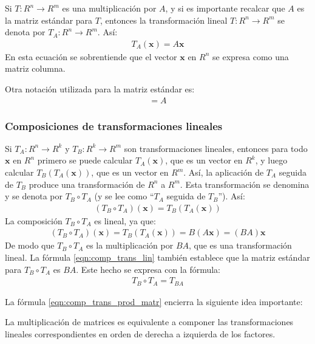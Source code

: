 \documentclass[a4paper,12pt]{article}
\begin{document}
Si $T:R^n\rightarrow R^m$ es una multiplicación por $A$, y si es importante
recalcar que $A$ es la matriz estándar para $T$, entonces la transformación
lineal $T:R^n\rightarrow R^m$ se denota por $T_A:R^n\rightarrow R^m$. Así:
\begin{align*}
  T_A(\mathbf{x})=A\mathbf{x}
\end{align*}
En esta ecuación se sobrentiende que el vector $\mathbf{x}$ en $R^n$ se
expresa como una matriz columna.

Otra notación utilizada para la matriz estándar es:
\begin{align*}
  [T_A]=A
\end{align*}

\subsubsection{Composiciones de transformaciones lineales}

Si $T_A:R^n\rightarrow R^k$ y $T_B:R^k\rightarrow R^m$ son transformaciones
lineales, entonces para todo $\mathbf{x}$ en $R^n$ primero se puede calcular
$T_A(\mathbf{x})$, que es un vector en $R^k$, y luego calcular $T_B\left(
T_A(\mathbf{x}) \right)$, que es un vector en $R^m$. Así, la aplicación de
$T_A$ seguida de $T_B$ produce una transformación de $R^n$ a $R^m$. Esta
transformación se denomina  y se denota por
$T_B\circ T_A$ (y se lee como ``$T_A$ seguida de $T_B$''). Así:
\begin{align*}
  \left( T_B\circ T_A \right)(\mathbf{x})=T_B\left( T_A(\mathbf{x}) \right)
\end{align*}
La composición $T_B\circ T_A$ es lineal, ya que:
\begin{align}
  \left( T_B\circ T_A \right)(\mathbf{x})=T_B\left( T_A(\mathbf{x})
  \right)=B(A\mathbf{x})=(BA)\mathbf{x}
  \label{eqn:comp_trans_lin}
\end{align}
De modo que $T_B\circ T_A$ es la multiplicación por $BA$, que es una
transformación lineal. La fórmula \eqref{eqn:comp_trans_lin} también establece
que la matriz estándar para $T_B\circ T_A$ es $BA$. Este hecho se expresa con
la fórmula:
\begin{align}
  T_B\circ T_A = T_{BA}
  \label{eqn:comp_trans_prod_matr}
\end{align}

\obse La fórmula \eqref{eqn:comp_trans_prod_matr} encierra la siguiente idea
importante:
\begin{concept}[i]
  La multiplicación de matrices es equivalente a componer las transformaciones
  lineales correspondientes en orden de derecha a izquierda de los factores.
\end{concept}
\end{document}
